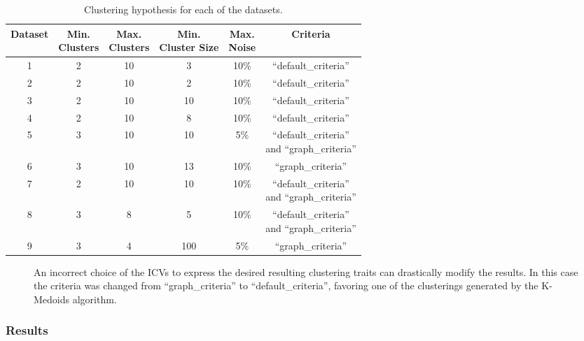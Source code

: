 \begin{table}
\centering
\begin{tabular}{ c c c c c c }
\toprule
Dataset & \specialcell{Min.\\Clusters} & \specialcell{Max.\\Clusters} & \specialcell{Min.\\Cluster Size} & \specialcell{Max.\\Noise} & Criteria\\
\midrule
1 & 2 & 10 & 3 & 10\% & ``default\_criteria''\\
2 & 2 & 10 & 2 & 10\% & ``default\_criteria''\\
3 & 2 & 10 & 10 & 10\% & ``default\_criteria''\\
4 & 2 & 10 & 8 & 10\% & ``default\_criteria''\\
5 & 3 & 10 & 10 & 5\% & \specialcell{``default\_criteria'' \\ and ``graph\_criteria''}\\
6 & 3 & 10 & 13 & 10\% & ``graph\_criteria''\\
7 & 2 & 10 & 10 & 10\% & \specialcell{``default\_criteria'' \\ and ``graph\_criteria''}\\
8 & 3 & 8 & 5 & 10\% & \specialcell{``default\_criteria'' \\ and ``graph\_criteria''}\\
9 & 3 & 4 & 100 & 5\% & ``graph\_criteria''\\
\bottomrule
\end{tabular} \protect\caption{Clustering hypothesis for each of the datasets.\label{tab:description_table}}


\end{table}

\begin{figure}

	\protect\caption{An incorrect choice of the ICVs to express the desired resulting clustering
	traits can drastically modify the results. In this case the criteria
	was changed from ``graph\_criteria'' to ``default\_criteria'',
	favoring one of the clusterings generated by the K-Medoids algorithm.
	\label{fig:concentric_circles}}
\end{figure}


\subsubsection{Results}


